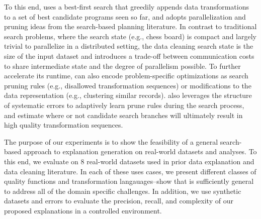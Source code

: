 To this end, \sys uses a best-first search that greedily appends data transformations to a set of best candidate programs seen so far, and adopts parallelization and pruning ideas from the search-based planning literature.  
In contrast to traditional search problems, where the search state (e.g., chess board) is compact and largely trivial to parallelize in a distributed setting, the data cleaning search state is the size of the input dataset and introduces a trade-off between communication costs to share intermediate state and the degree of parallelism possible.  
 To further accelerate its runtime, \sys can also encode problem-specific optimizations as search pruning rules (e.g., disallowed transformation sequences) or modifications to the data representation (e.g., clustering similar records).  
\sys also leverages the structure of systematic errors to adaptively learn prune rules during the search process, and estimate where or not candidate search branches will ultimately result in high quality transformation sequences.  
 
The purpose of our experiments is to show the feasibility of a general search-based approach to explanation generation on real-world datasets and analyses.  To this end, we evaluate \sys on 8 real-world datasets used in prior data explanation and data cleaning literature. In each of these uses cases, we present different classes of quality functions and transformation langauages--show that \sys is sufficiently general to address all of the domain specific challenges. 
In addition, we use synthetic datasets and errors to evaluate the precision, recall, and complexity of our proposed explanations in a controlled environment.  












